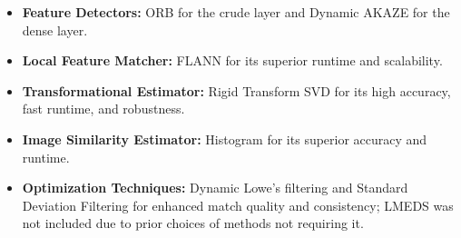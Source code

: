 \begin{itemize}
    \item \textbf{Feature Detectors:} ORB for the crude layer and Dynamic AKAZE for the dense layer.
    \item \textbf{Local Feature Matcher:} FLANN for its superior runtime and scalability.
    \item \textbf{Transformational Estimator:} Rigid Transform SVD for its high accuracy, fast runtime, and robustness.
    \item \textbf{Image Similarity Estimator:} Histogram for its superior accuracy and runtime.
    \item \textbf{Optimization Techniques:} Dynamic Lowe's filtering and Standard Deviation Filtering for enhanced match quality and consistency; LMEDS was not included due to prior choices of methods not requiring it.
\end{itemize}